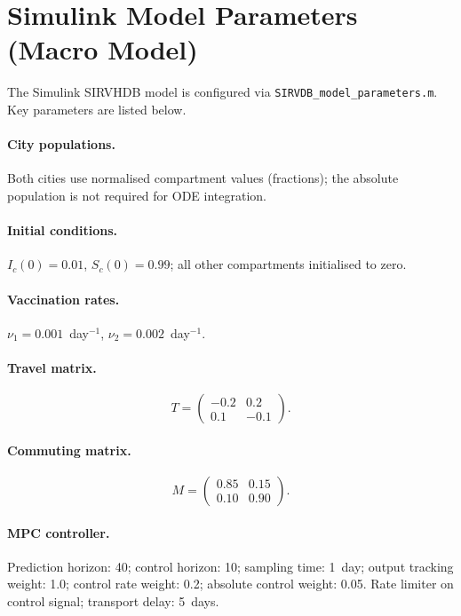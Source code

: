 \section{Simulink Model Parameters (Macro Model)}
\label{apx:simulink_params}

The Simulink SIRVHDB model is configured via \texttt{SIRVDB\_model\_parameters.m}.
Key parameters are listed below.

\paragraph{City populations.}
Both cities use normalised compartment values (fractions); the absolute population is not required for ODE integration.

\paragraph{Initial conditions.}
$I_c(0) = 0.01$, $S_c(0) = 0.99$; all other compartments initialised to zero.

\paragraph{Vaccination rates.}
$\nu_1 = 0.001$~day$^{-1}$, $\nu_2 = 0.002$~day$^{-1}$.

\paragraph{Travel matrix.}
\[
T = \begin{pmatrix} -0.2 & 0.2 \\ 0.1 & -0.1 \end{pmatrix}.
\]

\paragraph{Commuting matrix.}
\[
M = \begin{pmatrix} 0.85 & 0.15 \\ 0.10 & 0.90 \end{pmatrix}.
\]

\paragraph{MPC controller.}
Prediction horizon: 40; control horizon: 10; sampling time: 1~day;
output tracking weight: 1.0; control rate weight: 0.2; absolute control weight: 0.05.
Rate limiter on control signal; transport delay: 5~days.

